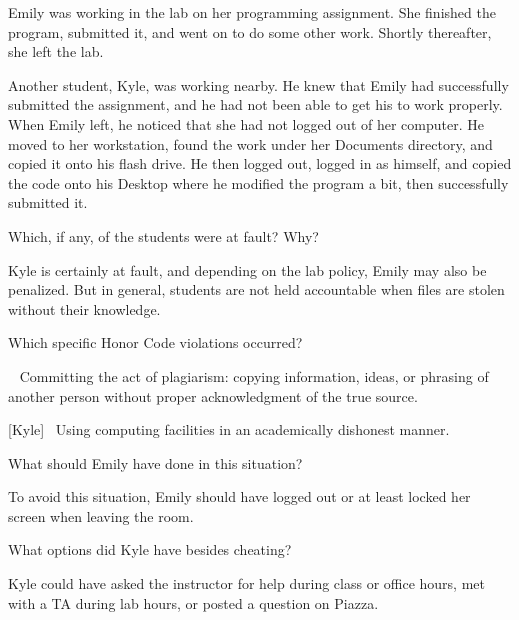 
Emily was working in the lab on her programming assignment.
She finished the program, submitted it, and went on to do some other work.
Shortly thereafter, she left the lab.

\vspace{1em}

Another student, Kyle, was working nearby.
He knew that Emily had successfully submitted the assignment, and he had not been able to get his to work properly.
When Emily left, he noticed that she had not logged out of her computer.
He moved to her workstation, found the work under her Documents directory, and copied it onto his flash drive.
He then logged out, logged in as himself, and copied the code onto his Desktop where he modified the program a bit, then successfully submitted it.




\Q Which, if any, of the students were at fault? Why?

\begin{answer}[6em]
Kyle is certainly at fault, and depending on the lab policy, Emily may also be penalized.
But in general, students are not held accountable when files are stolen without their knowledge.
\end{answer}


\Q Which specific Honor Code violations occurred?

\begin{answer}[8em]
[Kyle]~ Committing the act of plagiarism: copying information, ideas, or phrasing of another person without proper acknowledgment of the true source.

\bigskip

[Kyle]~ Using computing facilities in an academically dishonest manner.
\end{answer}


\Q What should Emily have done in this situation?

\begin{answer}[6em]
To avoid this situation, Emily should have logged out or at least locked her screen when leaving the room.
\end{answer}


\Q What options did Kyle have besides cheating?

\begin{answer}[6em]
Kyle could have asked the instructor for help during class or office hours, met with a TA during lab hours, or posted a question on Piazza.
\end{answer}
